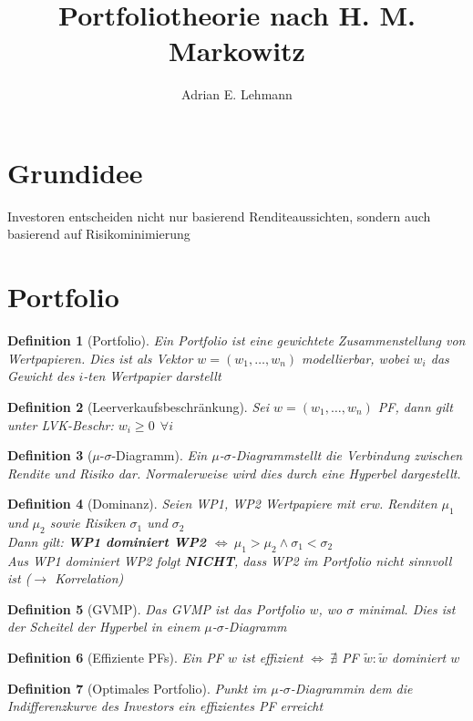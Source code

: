 \documentclass[a4paper]{article}
\title{Portfoliotheorie nach H. M. Markowitz}
\author{Adrian E. Lehmann}
\theoremstyle{break}
\newcommand{\msd}{$\mu$-$\sigma$-Diagramm}
\newtheorem{defi}{Definition}[section]
\begin{document}
        \maketitle
        \tableofcontents
        \newpage


\section{Grundidee}
    Investoren entscheiden nicht nur basierend  Renditeaussichten, sondern auch basierend auf Risikominimierung
\section{Portfolio}
    \begin{defi}[Portfolio]
        Ein Portfolio ist eine gewichtete Zusammenstellung von Wertpapieren. Dies ist als Vektor $w = (w_1, \dots, w_n)$ modellierbar, wobei $w_i$ das Gewicht des $i$-ten Wertpapier darstellt
    \end{defi}
    \begin{defi}[Leerverkaufsbeschränkung]
        Sei $w = (w_1, \dots, w_n)$ PF, dann gilt unter LVK-Beschr: $w_i \geq 0 ~ ~ \forall i$
    \end{defi}
    \begin{defi}[\msd]
        Ein \msd stellt die Verbindung zwischen Rendite und Risiko dar. Normalerweise wird dies durch eine Hyperbel dargestellt.
    \end{defi}
    \begin{defi}[Dominanz]
        Seien WP1, WP2 Wertpapiere mit erw. Renditen $\mu_1$ und $\mu_2$ sowie Risiken $\sigma_1$ und $\sigma_2$\\
        Dann gilt: \textbf{WP1 dominiert WP2 $\Longleftrightarrow ~ \mu_1 > \mu_2 \wedge \sigma_1 < \sigma_2$}\\
        \emph{Aus WP1 dominiert WP2 folgt \textbf{NICHT}, dass WP2 im Portfolio nicht sinnvoll ist ($\rightarrow$ Korrelation)}
    \end{defi}
    \begin{defi}[GVMP]
        Das GVMP ist das Portfolio $w$, wo $\sigma$ minimal. Dies ist der Scheitel der Hyperbel in einem \msd 
    \end{defi}
    \begin{defi}[Effiziente PFs]
        Ein PF $w$ ist effizient $\Longleftrightarrow ~ \nexists$ PF $\tilde{w}: \tilde{w}$ dominiert $w$
    \end{defi}
    \begin{defi}[Optimales Portfolio]
        Punkt im \msd in dem die Indifferenzkurve des Investors ein effizientes PF erreicht
    \end{defi}
\end{document}
